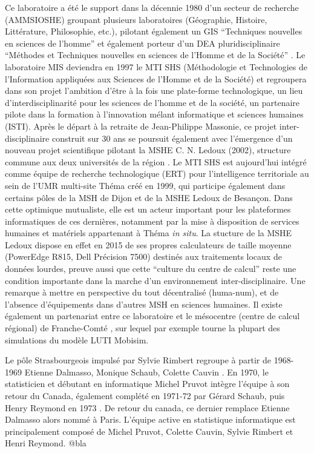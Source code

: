 Ce laboratoire a été le support dans la décennie 1980 d'un secteur de recherche (AMMSIOSHE) groupant plusieurs laboratoires (Géographie, Histoire, Littérature, Philosophie, etc.), pilotant également un GIS \enquote{Techniques nouvelles en sciences de l'homme} et également porteur d'un DEA pluridisciplinaire \enquote{Méthodes et Techniques nouvelles en sciences de l'Homme et de la Société} \autocite{TSH1984}. Le laboratoire MIS deviendra en 1997 le MTI SHS (Méthodologie et Technologies de l'Information appliquées aux Sciences de l'Homme et de la Société) \autocite{Girardot2004} et regroupera dans son projet l'ambition d'être à la fois une plate-forme technologique, un lieu d'interdisciplinarité pour les sciences de l'homme et de la société, un partenaire pilote dans la formation à l'innovation mélant informatique et sciences humaines (ISTI). Après le départ à la retraite de Jean-Philippe Massonie, ce projet inter-disciplinaire construit sur 30 ans se poursuit également avec l'émergence d'un nouveau projet scientifique pilotant la MSHE C. N. Ledoux (2002), structure commune aux deux universités de la région \autocites{Favory2003, Favory2009}. Le MTI SHS est aujourd'hui intégré comme équipe de recherche technologique (ERT) pour l'intelligence territoriale au sein de l'UMR multi-site Théma créé en 1999, qui participe également dans certains pôles de la MSH de Dijon et de la MSHE Ledoux de Besançon. Dans cette optimique mutualiste, elle est un acteur important pour les plateformes informatiques de ces dernières, notamment par la mise à disposition de services humaines et matériels appartenant à Théma \textit{in situ}. La stucture de la MSHE Ledoux dispose en effet en 2015 de ses propres calculateurs de taille moyenne (PowerEdge R815, Dell Précision 7500) destinés aux traitements locaux de données lourdes, preuve aussi que cette \enquote{culture du centre de calcul} reste une condition importante dans la marche d'un environnement inter-disciplinaire. Une remarque à mettre en perspective du tout décentralisé (huma-num), et de l'absence d'équipements dans d'autres MSH en sciences humaines. Il existe également un partenariat entre ce laboratoire et le mésocentre (centre de calcul régional) de Franche-Comté \autocite{Asch2012}, sur lequel par exemple tourne la plupart des simulations du modèle LUTI Mobisim.\autocites{Thema2010, Hirtzel2015}

Le pôle Strasbourgeois impulsé par Sylvie Rimbert regroupe à partir de 1968-1969 Etienne Dalmasso, Monique Schaub, Colette Cauvin . En 1970, le statisticien et débutant en informatique Michel Pruvot intègre l'équipe à son retour du Canada, également complété en 1971-72 par Gérard Schaub, puis Henry Reymond en 1973 \autocite[135-153]{Cuyala2014}. De retour du canada, ce dernier remplace Etienne Dalmasso alors nommé à Paris. L'équipe active en statistique informatique est principalement composé de Michel Pruvot, Colette Cauvin, Sylvie Rimbert et Henri Reymond. @bla

